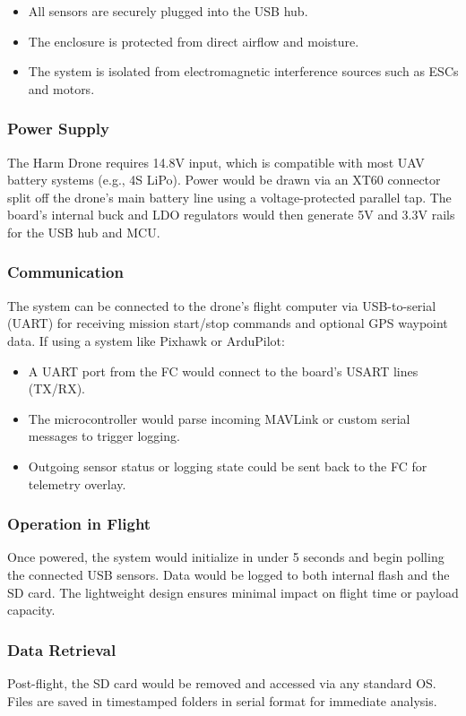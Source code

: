 \documentclass[../main.tex]{subfiles}
\begin{document}
\begin{itemize}
    \item All sensors are securely plugged into the USB hub.
    \item The enclosure is protected from direct airflow and moisture.
    \item The system is isolated from electromagnetic interference sources such as ESCs and motors.
\end{itemize}

\subsubsection*{Power Supply}
The Harm Drone requires 14.8V input, which is compatible with most UAV battery systems (e.g., 4S LiPo). Power would be drawn via an XT60 connector split off the drone’s main battery line using a voltage-protected parallel tap. The board's internal buck and LDO regulators would then generate 5V and 3.3V rails for the USB hub and MCU.

\subsubsection{Communication}
The system can be connected to the drone’s flight computer via USB-to-serial (UART) for receiving mission start/stop commands and optional GPS waypoint data. If using a system like Pixhawk or ArduPilot:

\begin{itemize}
    \item A UART port from the FC would connect to the board’s USART lines (TX/RX).
    \item The microcontroller would parse incoming MAVLink or custom serial messages to trigger logging.
    \item Outgoing sensor status or logging state could be sent back to the FC for telemetry overlay.
\end{itemize}

\subsubsection{Operation in Flight}
Once powered, the system would initialize in under 5 seconds and begin polling the connected USB sensors. Data would be logged to both internal flash and the SD card. The lightweight design ensures minimal impact on flight time or payload capacity.

\subsubsection{Data Retrieval}
Post-flight, the SD card would be removed and accessed via any standard OS. Files are saved in timestamped folders in serial format for immediate analysis.
\end{document}
